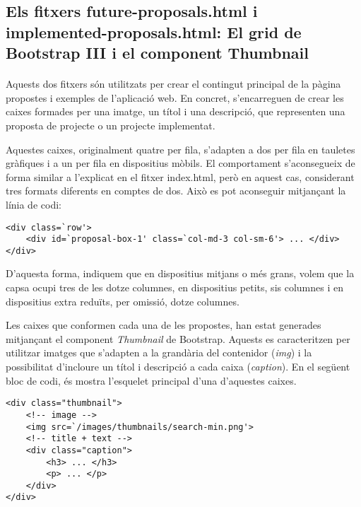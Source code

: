 \subsection{Els fitxers future-proposals.html i implemented-proposals.html: El grid de Bootstrap III i el component Thumbnail}

    \paragraph{}
    Aquests dos fitxers són utilitzats per crear el contingut principal de la pàgina propostes i exemples de l'aplicació web. En concret, s'encarreguen de crear les caixes formades per una imatge, un títol i una descripció, que representen una proposta de projecte o un projecte implementat.

    Aquestes caixes, originalment quatre per fila, s'adapten a dos per fila en tauletes gràfiques i a un per fila en dispositius mòbils. El comportament s'aconsegueix de forma similar a l'explicat en el fitxer index.html, però en aquest cas, considerant tres formats diferents en comptes de dos. Això es pot aconseguir mitjançant la línia de codi:

    \begin{lstlisting}[style=rawOwn,caption={Multiples configuracions en un bloc de columnes}]
<div class=`row'>
    <div id=`proposal-box-1' class=`col-md-3 col-sm-6'> ... </div>
</div>
    \end{lstlisting}

    D'aquesta forma, indiquem que en dispositius mitjans o més grans, volem que la capsa ocupi tres de les dotze columnes, en dispositius petits, sis columnes i en dispositius extra reduïts, per omissió, dotze columnes.

    Les caixes que conformen cada una de les propostes, han estat generades mitjançant el component \emph{Thumbnail} de Bootstrap. Aquests es caracteritzen per utilitzar imatges que s'adapten a la grandària del contenidor (\emph{img}) i la possibilitat d'incloure un títol i descripció a cada caixa (\emph{caption}). En el següent bloc de codi, és mostra l'esquelet principal d'una d'aquestes caixes.

    \begin{lstlisting}[style=rawOwn,caption={Exemple de Bootstrap Thumbnail}]
<div class="thumbnail">
    <!-- image -->
    <img src=`/images/thumbnails/search-min.png'>
    <!-- title + text -->
    <div class="caption">
        <h3> ... </h3>
        <p> ... </p>
    </div>
</div>
    \end{lstlisting}
